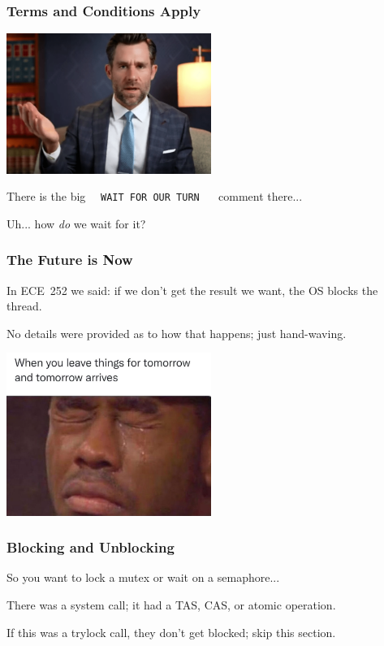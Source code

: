 \begin{frame}
\frametitle{Terms and Conditions Apply}

\begin{center}
	\includegraphics[width=0.5\textwidth]{images/legaleagle.png}
\end{center}

There is the big ~~\texttt{WAIT FOR OUR TURN} ~~ comment there...

Uh... how \textit{do} we wait for it?

\end{frame}

\begin{frame}
\frametitle{The Future is Now}

In ECE~252 we said: if we don't get the result we want, the OS blocks the thread.

No details were provided as to how that happens; just hand-waving.

\begin{center}
	\includegraphics[width=0.5\textwidth]{images/tomorrow.png}
\end{center}

\end{frame}

\begin{frame}
\frametitle{Blocking and Unblocking}

So you want to lock a mutex or wait on a semaphore...

There was a system call; it had a TAS, CAS, or atomic operation.

If this was a trylock call, they don't get blocked; skip this section.

\end{frame}

